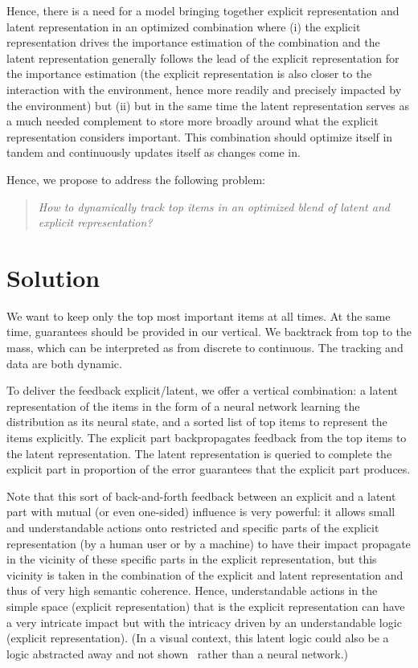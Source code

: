 Hence, there is a need for a model bringing together explicit representation and latent representation in an optimized combination where (i) the explicit representation drives the importance estimation of the combination and the latent representation generally follows the lead of the explicit representation for the importance estimation (the explicit representation is also closer to the interaction with the environment, hence more readily and precisely impacted by the environment) but (ii) but in the same time the latent representation serves as a much needed complement to store more broadly around what the explicit representation considers important.
This combination should optimize itself in tandem and continuously updates itself as changes come in.

Hence, we propose to address the following problem:
% 
\begin{quote}
    \itshape{How to dynamically track top items in an optimized blend of latent and explicit representation?}
\end{quote}



\section{Solution}

We want to keep only the top most important items at all times. At the same time, guarantees should be provided in our vertical. We backtrack from top to the mass, which can be interpreted as from discrete to continuous. The tracking and data are both dynamic.

To deliver the feedback explicit/latent, we offer a vertical combination: a latent representation of the items in the form of a neural network learning the distribution as its neural state, and a sorted list of top items to represent the items explicitly. The explicit part backpropagates feedback from the top items to the latent representation. The latent representation is queried to complete the explicit part in proportion of the error guarantees that the explicit part produces.

Note that this sort of back-and-forth feedback between an explicit and a latent part with mutual (or even one-sided) influence is very powerful: it allows small and understandable actions onto restricted and specific parts of the explicit representation (by a human user or by a machine) to have their impact propagate in the vicinity of these specific parts in the explicit representation, but this vicinity is taken in the combination of the explicit and latent representation and thus of very high semantic coherence. Hence, understandable actions in the simple space (explicit representation) that is the explicit representation can have a very intricate impact but with the intricacy driven by an understandable logic (explicit representation). (In a visual context, this latent logic could also be a logic abstracted away and not shown~\cite{kraska2021northstar} rather than a neural network.)

